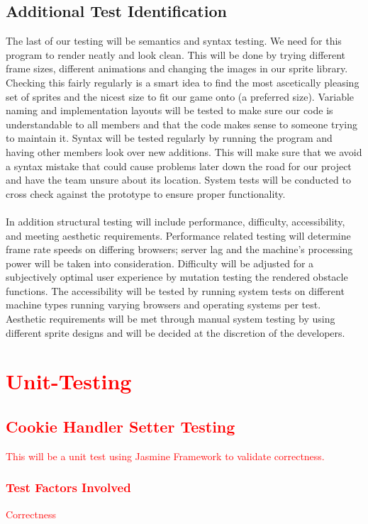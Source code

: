\documentclass[11pt, oneside]{article}   	%
\begin{document}
\subsection{Additional Test Identification}
The last of our testing will be semantics and syntax testing. We need for this program to render neatly and look clean. This will be done by trying different frame sizes, different animations and changing the images in our sprite library. Checking this fairly regularly is a smart idea to find the most ascetically pleasing set of sprites and the nicest size to fit our game onto (a preferred size). Variable naming and implementation layouts will be tested to make sure our code is understandable to all members and that the code makes sense to someone trying to maintain it. Syntax will be tested regularly by running the program and having other members look over new additions. This will make sure that we avoid a syntax mistake that could cause problems later down the road for our project and have the team unsure about its location. System tests will be conducted to cross check against the prototype to ensure proper functionality.\\
\\
In addition structural testing will include performance, difficulty, accessibility, and meeting aesthetic requirements. Performance related testing will determine frame rate speeds on differing browsers; server lag and the machine's processing power will be taken into consideration. Difficulty will be adjusted for a subjectively optimal user experience by mutation testing the rendered obstacle functions. The accessibility will be tested by running system tests on different machine types running varying browsers and operating systems per test. Aesthetic requirements will be met through manual system testing by using different sprite designs and will be decided at the discretion of the developers.


\section{\textcolor{red}{Unit-Testing}}

\subsection{\textcolor{red}{Cookie Handler Setter Testing}}
\textcolor{red}{This will be a unit test using Jasmine Framework to validate correctness.}
\subsubsection{\textcolor{red}{Test Factors Involved}}
\textcolor{red}{Correctness}
\end{document}
